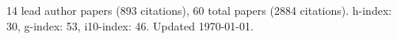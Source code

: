 14 lead author papers (893 citations),
60 total papers (2884 citations).\newline
h-index: 30, g-index: 53, i10-index: 46. Updated \today.